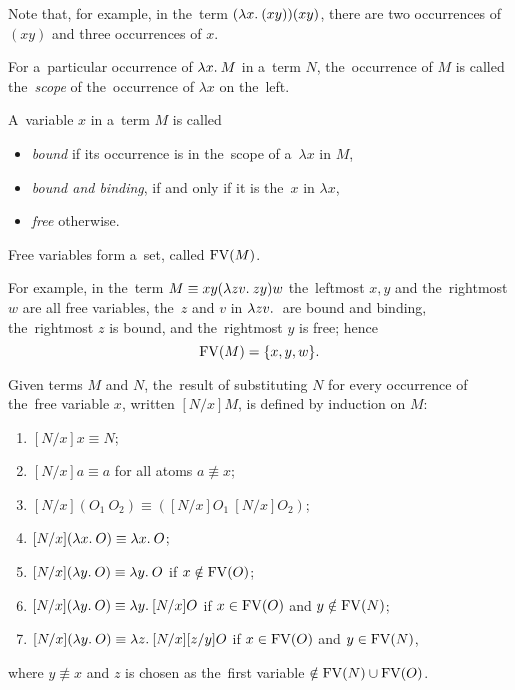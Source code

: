 Note that, for example, in the~term $(\lambda x . \: ( x y)) (x y)$, there are two
occurrences of $(x y)$ and three occurrences of $x$.

\begin{definition}
  For a~particular occurrence of $\lambda x . \: M$ in a~term $N$, the~occurrence of $M$
  is called the~\emph{scope} of the~occurrence of $\lambda x$ on the~left.
\end{definition}

\begin{definition}
  A~variable $x$ in a~term $M$ is called
  \begin{itemize}
    \item \emph{bound} if its occurrence is in the~scope of a~$\lambda x$ in
      $M$,
    \item \emph{bound and binding}, if and only if it is the~$x$ in $\lambda x$,
    \item \emph{free} otherwise.
  \end{itemize}
  Free variables form a~set, called $\mathrm{FV}(M)$.
\end{definition}

For example, in the~term $M \equiv xy(\lambda zv . \: zy)w$ the~leftmost $x, y$ and
the~rightmost $w$ are all free variables, the~$z$ and $v$ in $\lambda zv . \: $ are
bound and binding, the~rightmost $z$ is bound, and the~rightmost $y$ is free;
hence
\[
  \mathrm{FV}(M) = \{x, y, w\} .
\]

\begin{definition}[Substitution]\label{def:substitution}
  Given terms $M$ and $N$, the~result of substituting $N$ for every occurrence
  of the~free variable $x$, written $[N/x]M$, is defined by induction on $M$:
  \begin{enumerate}
    \item $[N/x]x  \equiv N$;
    \item $[N/x]a  \equiv a$  \hfill for all atoms $a \not\equiv x$;
    \item $[N/x](O_1 \: O_2)  \equiv ([N/x]O_1 \: [N/x]O_2)$;
    \item $[N/x](\lambda x . \: O)  \equiv \lambda x . \: O$;
    \item $[N/x](\lambda y . \: O)  \equiv \lambda y . \: O$ \hfill if $x \notin \mathrm{FV}(O)$;
    \item $[N/x](\lambda y . \: O)  \equiv \lambda y . \: [N/x]O$
      \hfill if $x \in \mathrm{FV}(O)$ and $y \notin \mathrm{FV}(N)$;
    \item \label{def:substitution:g_item} $[N/x](\lambda y . \: O)
      \equiv \lambda z . \: [N/x][z/y]O$ \hfill if $x \in \mathrm{FV}(O)$ and $y \in \mathrm{FV}(N)$,
  \end{enumerate}
  where $y \not\equiv x$ and $z$ is chosen as the~first variable $\notin \mathrm{FV}(N)
  \cup \mathrm{FV}(O)$.
\end{definition}

